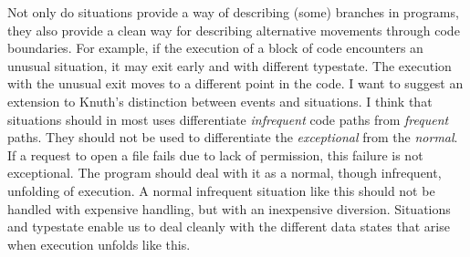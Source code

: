 \documentclass[10pt]{amsart}
\begin{document}
Not only do situations provide a way of describing (some) branches in
programs, they also provide a clean way for describing alternative
movements through code boundaries.  For example, if the execution of a
block of code encounters an unusual situation, it may exit early and
with different typestate.  The execution with the unusual exit moves
to a different point in the code.  I want to suggest an extension to
Knuth's distinction between events and situations.  I think that
situations should in most uses differentiate \emph{infrequent} code
paths from \emph{frequent} paths.  They should not be used to
differentiate the \emph{exceptional} from the \emph{normal}.  If a
request to open a file fails due to lack of permission, this failure
is not exceptional.  The program should deal with it as a normal,
though infrequent, unfolding of execution.  A normal infrequent
situation like this should not be handled with expensive handling, but
with an inexpensive diversion.  Situations and typestate enable us to
deal cleanly with the different data states that arise when execution
unfolds like this.




\end{document}
